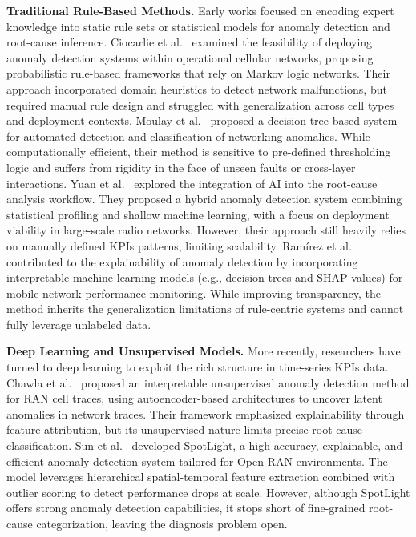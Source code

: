\documentclass[lettersize,journal]{IEEEtran}
\begin{document}
\noindent\textbf{Traditional Rule-Based Methods.}
Early works focused on encoding expert knowledge into static rule sets or statistical models for anomaly detection and root-cause inference. Ciocarlie et al.~\cite{ciocarlie2014feasibility} examined the feasibility of deploying anomaly detection systems within operational cellular networks, proposing probabilistic rule-based frameworks that rely on Markov logic networks. Their approach incorporated domain heuristics to detect network malfunctions, but required manual rule design and struggled with generalization across cell types and deployment contexts. Moulay et al.~\cite{moulay2020novel} proposed a decision-tree-based system for automated detection and classification of networking anomalies. While computationally efficient, their method is sensitive to pre-defined thresholding logic and suffers from rigidity in the face of unseen faults or cross-layer interactions. Yuan et al.~\cite{yuan2020anomaly} explored the integration of AI into the root-cause analysis workflow. They proposed a hybrid anomaly detection system combining statistical profiling and shallow machine learning, with a focus on deployment viability in large-scale radio networks. However, their approach still heavily relies on manually defined KPIs patterns, limiting scalability. Ramírez et al.~\cite{ramirez2023explainable} contributed to the explainability of anomaly detection by incorporating interpretable machine learning models (e.g., decision trees and SHAP values) for mobile network performance monitoring. While improving transparency, the method inherits the generalization limitations of rule-centric systems and cannot fully leverage unlabeled data.

\noindent\textbf{Deep Learning and Unsupervised Models.}
More recently, researchers have turned to deep learning to exploit the rich structure in time-series KPIs data. Chawla et al.~\cite{chawla2020interpretable} proposed an interpretable unsupervised anomaly detection method for RAN cell traces, using autoencoder-based architectures to uncover latent anomalies in network traces. Their framework emphasized explainability through feature attribution, but its unsupervised nature limits precise root-cause classification. Sun et al.~\cite{sun2024spotlight} developed SpotLight, a high-accuracy, explainable, and efficient anomaly detection system tailored for Open RAN environments. The model leverages hierarchical spatial-temporal feature extraction combined with outlier scoring to detect performance drops at scale. However, although SpotLight offers strong anomaly detection capabilities, it stops short of fine-grained root-cause categorization, leaving the diagnosis problem open.
\end{document}
